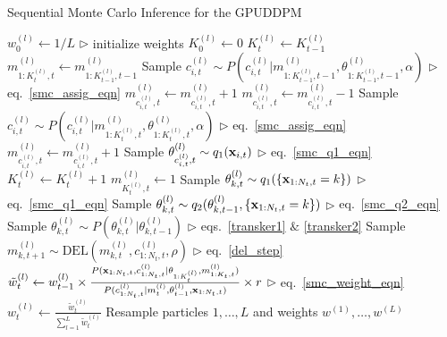 \documentclass[smallcondensed, final]{svjour3}
\begin{document}
\begin{algorithm}[!]
\caption{Sequential Monte Carlo Inference for the GPUDDPM}
\label{alg:SMC}
\begin{algorithmic}[1]
\STATE $w_{0}^{(l)} \leftarrow 1/L$ \hfill $\triangleright$ initialize weights
\ENDFOR
\STATE $K_{0}^{(l)} \leftarrow 0$
\STATE $K_{t}^{(l)}  \leftarrow K_{t-1}^{(l)}$
\STATE $m_{1:K_{t}^{(l)}, t}^{(l)} \leftarrow m_{1:K_{t-1}^{(l)}, t-1}^{(l)}$
\STATE Sample $c_{i,t}^{(l)} \sim P \left( c_{i,t}^{(l)} | m_{1:K_{t-1}^{(l)}, t-1}^{(l)}, \theta_{1:K_{t-1}^{(l)}, t-1}^{(l)}, \alpha \right)$  \hfill $\triangleright$ eq.~\eqref{smc_assig_eqn}
\STATE $m_{c_{i,t}^{(l)},t}^{(l)} \leftarrow m_{c_{i,t}^{(l)},t}^{(l)} + 1$
\ELSE
\STATE $m_{c_{i,t}^{(l)},t}^{(l)} \leftarrow m_{c_{i,t}^{(l)},t}^{(l)} - 1$
\STATE Sample $c_{i,t}^{(l)} \sim P \left( c_{i,t}^{(l)} | m_{1:K_{t}^{(l)}, t}^{(l)}, \theta_{1:K_{t}^{(l)}, t}^{(l)}, \alpha \right)$  \hfill $\triangleright$ eq.~\eqref{smc_assig_eqn}
\STATE $m_{c_{i,t}^{(l)},t}^{(l)} \leftarrow m_{c_{i,t}^{(l)},t}^{(l)} + 1$
\ENDIF
{}
\STATE Sample $\theta_{c_{i,t}^{(l)}, t}^{(l)} \sim q_{1}(\bold{x}_{i,t})$ \hfill $\triangleright$ eq.~\eqref{smc_q1_eqn}
\STATE $K_{t}^{(l)} \leftarrow K_{t}^{(l)} + 1$
\STATE $m_{K_{t}^{(l)},t}^{(l)} \leftarrow 1$
\ENDIF
\ENDFOR
{}
\STATE Sample $\theta_{k,t}^{(l)} \sim q_{1}(\{ \bold{x}_{1:N_{t}, t} = k \})$  \hfill $\triangleright$ eq.~\eqref{smc_q1_eqn}
\STATE Sample $\theta_{k,t}^{(l)} \sim q_{2}(\theta_{k,t-1}^{(l)}, \{ \bold{x}_{1:N_{t}, t} = k \})$  \hfill $\triangleright$ eq.~\eqref{smc_q2_eqn}
\STATE Sample $\theta_{k,t}^{(l)} \sim P(\theta_{k,t}^{(l)} | \theta_{k,t-1}^{(l)})$  \hfill $\triangleright$ eqs.~\eqref{transker1} $\&$ \eqref{transker2}
\ENDIF
{}
\STATE Sample $m_{k,t+1}^{(l)} \sim \text{DEL}(m_{k,t}^{(l)}, c_{1:N_{t}, t}^{(l)}, \rho)$  \hfill $\triangleright$ eq.~\eqref{del_step}
\ENDIF
\ENDFOR
\ENDFOR
\STATE $\tilde{w}_{t}^{(l)} \leftarrow w_{t-1}^{(l)} \times \frac{ P(\bold{x}_{1:N_{t},t}, c_{1:N_{t}, t}^{(l)} | \theta_{1:K_{t}^{(l)}}, m_{1:K_{t},t}^{(l)})}	{P(c_{1:N_{t}, t}^{(l)} | m_{t}^{(l)}, \theta_{t-1}^{(l)}, \bold{x}_{1:N_{t},t} ) } \times r $  \hfill $\triangleright$ eq.~\eqref{smc_weight_eqn}
\ENDFOR
{}
\STATE $w_{t}^{(l)} \leftarrow \frac{\tilde{w}_{t}^{(l)}}{\sum_{l=1}^{L} \tilde{w}_{t}^{(l)} }$
\ENDFOR
\STATE Resample particles $1, \ldots, L$ and weights $w^{(1)}, \ldots, w^{(L)}$
\ENDFOR
\end{algorithmic}
\end{algorithm}
\end{document}
